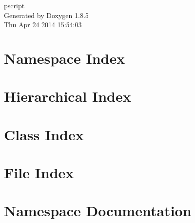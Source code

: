 \documentclass[twoside]{book}
\newcommand{\clearemptydoublepage}{%
  \newpage{\pagestyle{empty}\cleardoublepage}%
}
\begin{document}
\hypersetup{pageanchor=false}
\begin{titlepage}
\vspace*{7cm}
\begin{center}%
{\Large pscript }\\
\vspace*{1cm}
{\large Generated by Doxygen 1.8.5}\\
\vspace*{0.5cm}
{\small Thu Apr 24 2014 15:54:03}\\
\end{center}
\end{titlepage}
\clearemptydoublepage
\tableofcontents
\clearemptydoublepage
{}
\hypersetup{pageanchor=true}

\chapter{Namespace Index}

\chapter{Hierarchical Index}

\chapter{Class Index}

\chapter{File Index}

\chapter{Namespace Documentation}


























\end{document}
